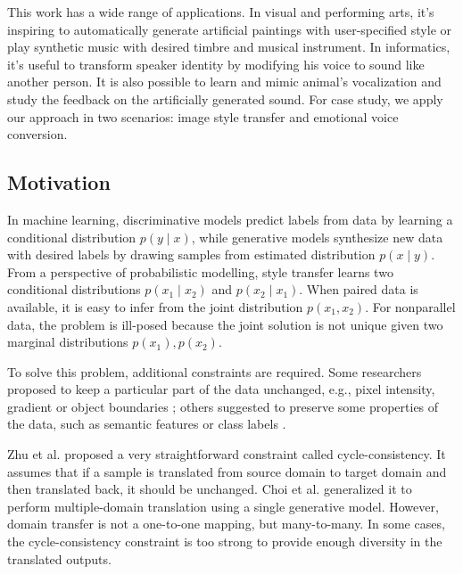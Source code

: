 \documentclass{article}
\begin{document}
This work has a wide range of applications. In visual and performing arts, it's inspiring to automatically generate artificial paintings with user-specified style or play synthetic music with desired timbre and musical instrument. In informatics, it's useful to transform speaker identity by modifying his voice to sound like another person. It is also possible to learn and mimic animal's vocalization and study the feedback on the artificially generated sound. For case study, we apply our approach in two scenarios: image style transfer and emotional voice conversion.

\subsection{Motivation} %
In machine learning, discriminative models predict labels from data by learning a conditional distribution $p(y\mid x)$, while generative models {\color{blue} synthesize} new data with desired labels by drawing samples from estimated distribution $p(x\mid y)$. From a perspective of probabilistic modelling, style transfer learns two conditional distributions $p(x_1\mid x_2)$ and $p(x_2\mid x_1)$. When paired data is available, it is easy to infer from the joint distribution $p(x_1,x_2)$. For nonparallel data, the problem is ill-posed because the joint solution is not unique given two marginal distributions $p(x_1), p(x_2)$.

To solve this problem, additional constraints are required. Some researchers proposed to keep a particular part of the data unchanged, e.g., pixel intensity, gradient or object boundaries \cite{8099501,Shrivastava_2017_CVPR}; others suggested to preserve some properties of the data, such as semantic features or class labels \cite{DBLP:journals/corr/TaigmanPW16}.

Zhu et al. \cite{Zhu_2017_ICCV} proposed a very straightforward constraint called cycle-consistency. It assumes that if a sample is translated from source domain to target domain and then translated back, it should be unchanged. Choi et al. \cite{Gong:2016:DAC:3045390.3045689} generalized it to perform multiple-domain translation using a single generative model. However, domain transfer is not a one-to-one mapping, but many-to-many. In some cases, the cycle-consistency constraint is too strong to provide enough diversity in the translated outputs.
\end{document}
